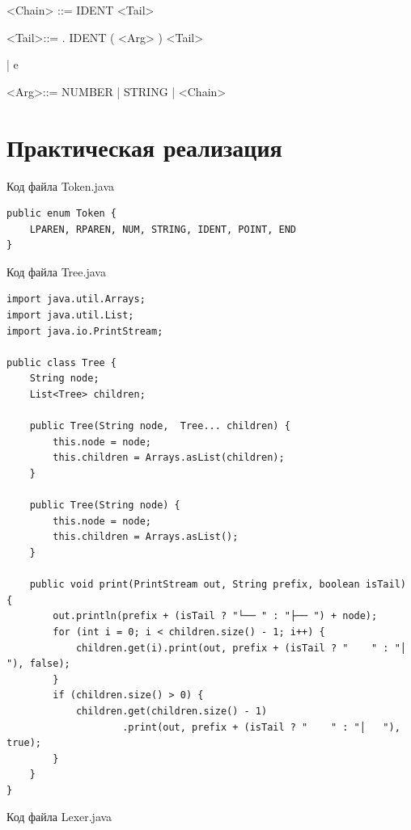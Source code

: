 \documentclass[a4paper, 14pt]{extarticle}
\begin{document}
<Chain> ::= IDENT <Tail> \par
<Tail>::= . IDENT ( <Arg> ) <Tail> \par
| 
e \par
<Arg>::= NUMBER | STRING | <Chain>


\pagebreak
\section{Практическая реализация}
\par
Код файла Token.java
\begin{lstlisting}
public enum Token {
    LPAREN, RPAREN, NUM, STRING, IDENT, POINT, END
}
\end{lstlisting}
\par
Код файла Tree.java
\begin{lstlisting}
import java.util.Arrays;
import java.util.List;
import java.io.PrintStream;

public class Tree {
    String node;
    List<Tree> children;

    public Tree(String node,  Tree... children) {
        this.node = node;
        this.children = Arrays.asList(children);
    }

    public Tree(String node) {
        this.node = node;
        this.children = Arrays.asList();
    }

    public void print(PrintStream out, String prefix, boolean isTail) {
        out.println(prefix + (isTail ? "└── " : "├── ") + node);
        for (int i = 0; i < children.size() - 1; i++) {
            children.get(i).print(out, prefix + (isTail ? "    " : "│   "), false);
        }
        if (children.size() > 0) {
            children.get(children.size() - 1)
                    .print(out, prefix + (isTail ? "    " : "│   "), true);
        }
    }
}
\end{lstlisting}
\par
Код файла Lexer.java
\end{document}
